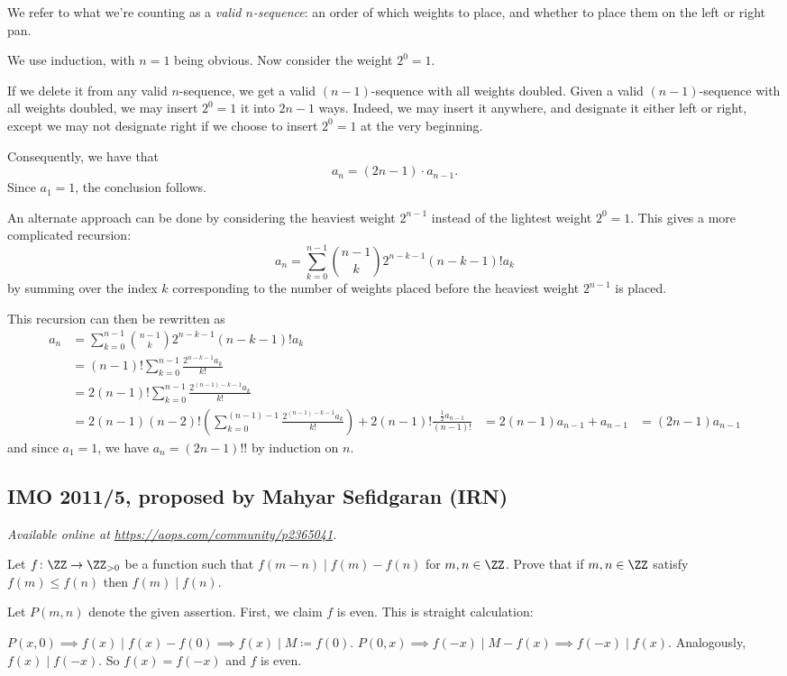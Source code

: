 \documentclass[11pt]{scrartcl}
\begin{document}
We refer to what we're counting as a \emph{valid $n$-sequence}:
an order of which weights to place,
and whether to place them on the left or right pan.

We use induction, with $n=1$ being obvious.
Now consider the weight $2^0 = 1$.
\begin{itemize}
  \ii If we delete it from any valid $n$-sequence,
  we get a valid $(n-1)$-sequence with all weights doubled.
  \ii Given a valid $(n-1)$-sequence with all weights doubled,
  we may insert $2^0 = 1$ it into $2n-1$ ways.
  Indeed, we may insert it anywhere, and designate it either left or right,
  except we may not designate right if we choose to insert
  $2^0 = 1$ at the very beginning.
\end{itemize}
Consequently, we have that
\[ a_n = (2n-1) \cdot a_{n-1}. \]
Since $a_1 = 1$, the conclusion follows.

\begin{remark*}
  An alternate approach can be done by considering the heaviest weight $2^{n-1}$
  instead of the lightest weight $2^0=1$.
  This gives a more complicated recursion:
  \[ a_n = \sum_{k=0}^{n-1} \binom{n-1}{k} 2^{n-k-1} (n-k-1)! a_k \]
  by summing over the index $k$ corresponding to the number of weights
  placed before the heaviest weight $2^{n-1}$ is placed.

  This recursion can then be rewritten as
  \begin{align*}
    a_n &= \sum_{k=0}^{n-1} \binom{n-1}{k} 2^{n-k-1} (n-k-1)! a_k \\
    &= (n-1)! \sum_{k=0}^{n-1} \frac{2^{n-k-1}a_k}{k!} \\
    &= 2(n-1)! \sum_{k=0}^{n-1} \frac{2^{(n-1)-k-1}a_k}{k!} \\
    &= 2(n-1)(n-2)! (\sum_{k=0}^{(n-1)-1} \frac{2^{(n-1)-k-1}a_k}{k!}) + 2(n-1)!
  \frac{\frac12 a_{n-1}}{(n-1)!}
    &= 2(n-1) a_{n-1} + a_{n-1}
    &= (2n-1)a_{n-1}
  \end{align*}
  and since $a_1 = 1$, we have $a_n = (2n-1)!!$ by induction on $n$.
\end{remark*}
\pagebreak

\subsection{IMO 2011/5, proposed by Mahyar Sefidgaran (IRN)}
\textsl{Available online at \url{https://aops.com/community/p2365041}.}
\begin{mdframed}[style=mdpurplebox,frametitle={Problem statement}]
Let $f \colon \ZZ \to \ZZ_{>0}$ be a function such that
$f(m-n) \mid f(m) - f(n)$ for $m,n \in \ZZ$.
Prove that if $m,n \in \ZZ$ satisfy $f(m) \le f(n)$
then $f(m) \mid f(n)$.
\end{mdframed}
Let $P(m,n)$ denote the given assertion.
First, we claim $f$ is even.
This is straight calculation:
\begin{itemize}
  \ii $P(x,0) \implies f(x) \mid f(x)-f(0)
  \implies f(x) \mid M \coloneqq f(0)$.
  \ii $P(0,x) \implies f(-x) \mid M-f(x) \implies
  f(-x) \mid f(x)$.
  Analogously, $f(x) \mid f(-x)$.
  So $f(x) = f(-x)$ and $f$ is even.
\end{itemize}
\end{document}
